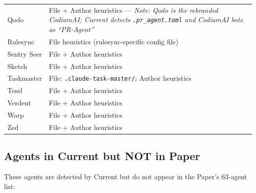 \documentclass[10pt,a4paper]{article}
\begin{document}
\begin{longtable}{L{3.2cm}L{10.3cm}}
Qodo             & File + Author heuristics — \emph{Note: Qodo is the rebranded CodiumAI; Current detects \texttt{.pr\_agent.toml} and CodiumAI bots as ``PR-Agent''} \\
Rulesync         & File heuristics (rulesync-specific config file) \\
Sentry Seer      & File + Author heuristics \\
Sketch           & File + Author heuristics \\
Taskmaster       & File: \texttt{.claude-task-master/}; Author heuristics \\
Tessl            & File + Author heuristics \\
Verdent          & File + Author heuristics \\
Warp             & File + Author heuristics \\
Zed              & File + Author heuristics \\

\end{longtable}

\newpage
\subsection{Agents in Current but NOT in Paper}

These agents are detected by Current but do not appear in the Paper's 63-agent list:
\end{document}
